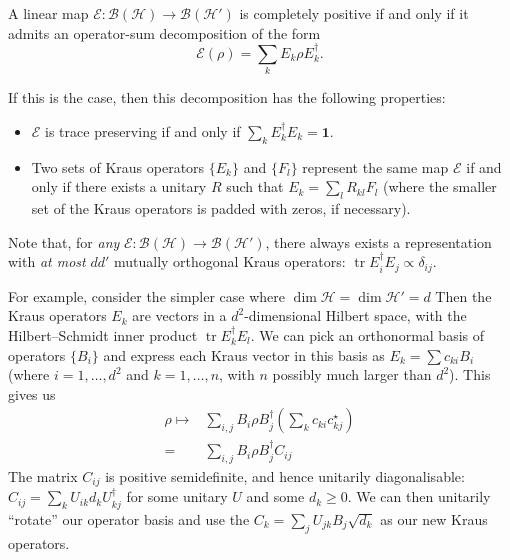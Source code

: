 \documentclass[fleqn]{article}
\providecommand{\tightlist}{%
  \setlength{\itemsep}{0pt}\setlength{\parskip}{0pt}}
\newenvironment{idea}{\noindent}{\medskip}
\begin{document}
\begin{idea}

A linear map \(\mathcal{E}\colon\mathcal{B}(\mathcal{H})\to\mathcal{B}(\mathcal{H}')\) is completely positive if and only if it admits an operator-sum decomposition of the form
\[
  \mathcal{E}(\rho) = \sum_k E_k\rho E^\dagger_k.
\]

If this is the case, then this decomposition has the following properties:

\begin{itemize}
\tightlist
\item
  \(\mathcal{E}\) is trace preserving if and only if \(\sum_k E^\dagger_kE_k=\mathbf{1}\).
\item
  Two sets of Kraus operators \(\{E_k\}\) and \(\{F_l\}\) represent the same map \(\mathcal{E}\) if and only if there exists a unitary \(R\) such that \(E_k =\sum_l R_{kl}F_l\) (where the smaller set of the Kraus operators is padded with zeros, if necessary).
\end{itemize}

\end{idea}

Note that, for \emph{any} \(\mathcal{E}\colon\mathcal{B}(\mathcal{H})\to\mathcal{B}(\mathcal{H}')\), there always exists a representation with \emph{at most} \(dd'\) mutually orthogonal Kraus operators: \(\operatorname{tr}E^\dagger_iE_j\propto\delta_{ij}\).

For example, consider the simpler case where \(\dim\mathcal{H}=\dim\mathcal{H}'=d\)
Then the Kraus operators \(E_k\) are vectors in a \(d^2\)-dimensional Hilbert space, with the Hilbert--Schmidt inner product \(\operatorname{tr}E^\dagger_k E_l\).
We can pick an orthonormal basis of operators \(\{B_i\}\) and express each Kraus vector in this basis as \(E_k=\sum c_{ki} B_i\) (where \(i=1,\ldots,d^2\) and \(k=1,\ldots,n\), with \(n\) possibly much larger than \(d^2\)).
This gives us
\[
  \begin{aligned}
    \rho
    \longmapsto
    & \sum_{i,j} B_i\rho B^\dagger_j \left(\sum _k c_{ki}c^\star_{kj}\right)
  \\=& \sum_{i,j} B_i\rho B^\dagger_j  C_{ij}
  \end{aligned}
\]
The matrix \(C_{ij}\) is positive semidefinite, and hence unitarily diagonalisable: \(C_{ij}=\sum_k U_{ik} d_k U^\dagger_{kj}\) for some unitary \(U\) and some \(d_k\geqslant 0\).
We can then unitarily ``rotate'' our operator basis and use the \(C_k=\sum_j U_{jk}B_j \sqrt{d_k}\) as our new Kraus operators.
\end{document}
